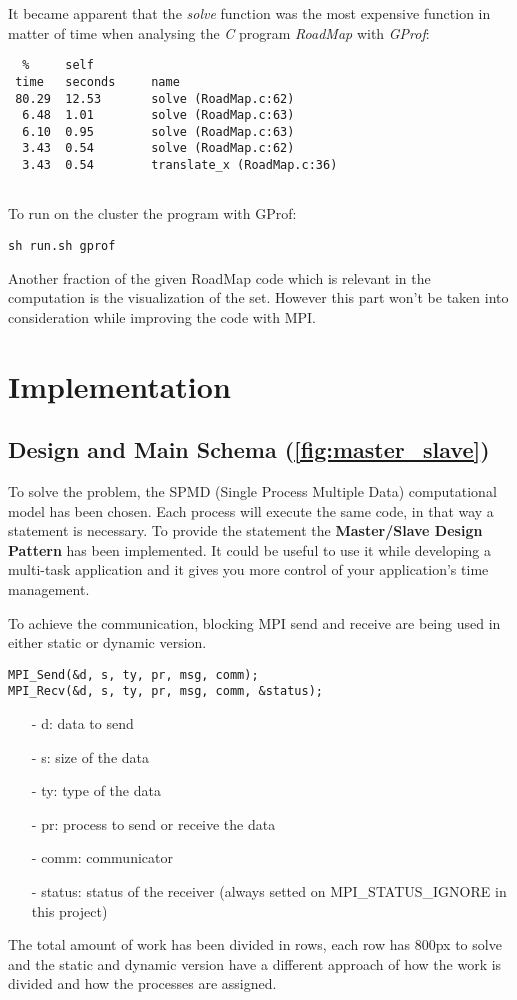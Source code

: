 \documentclass[11pt,conference]{IEEEtran}
\begin{document}
It became apparent that the \textit{solve} function was the most expensive function in matter of time when analysing the \textit{C} program \textit{RoadMap} with \textit{GProf}:
\begin{lstlisting}
  %   	self          
 time   seconds 	name    
 80.29  12.53		solve (RoadMap.c:62)
  6.48  1.01		solve (RoadMap.c:63)
  6.10  0.95		solve (RoadMap.c:63)
  3.43  0.54		solve (RoadMap.c:62)
  3.43  0.54		translate_x (RoadMap.c:36)
 
\end{lstlisting}
To run on the cluster the program with GProf:
\begin{lstlisting}
sh run.sh gprof
\end{lstlisting}
Another fraction of the given RoadMap code which is relevant in the computation is the visualization of the set. However this part won't be taken into consideration while improving the code with MPI.


\section{Implementation}

\subsection{Design and Main Schema (\ref{fig:master_slave})}
To solve the problem, the SPMD (Single Process Multiple Data) computational model has been chosen. Each process will execute the same code, in that way a statement is necessary. To provide the statement the \textbf{Master/Slave Design Pattern} has been implemented. It could be useful to use it while developing a multi-task application and it gives you more control of your application’s time management.\cite{citation4}

To achieve the communication, blocking MPI send and receive are being used in either static or dynamic version.
\begin{lstlisting}
MPI_Send(&d, s, ty, pr, msg, comm);
MPI_Recv(&d, s, ty, pr, msg, comm, &status);
\end{lstlisting}
\begin{itemize} 
\item[-] d: data to send
\item[-] s: size of the data
\item[-] ty: type of the data
\item[-] pr: process to send or receive the data
\item[-] comm: communicator
\item[-] status: status of the receiver (always setted on MPI\_STATUS\_IGNORE in this project)
\end{itemize}
The total amount of work has been divided in rows, each row has 800px to solve and the static and dynamic version have a different approach of how the work is divided and how the processes are assigned.
\end{document}
